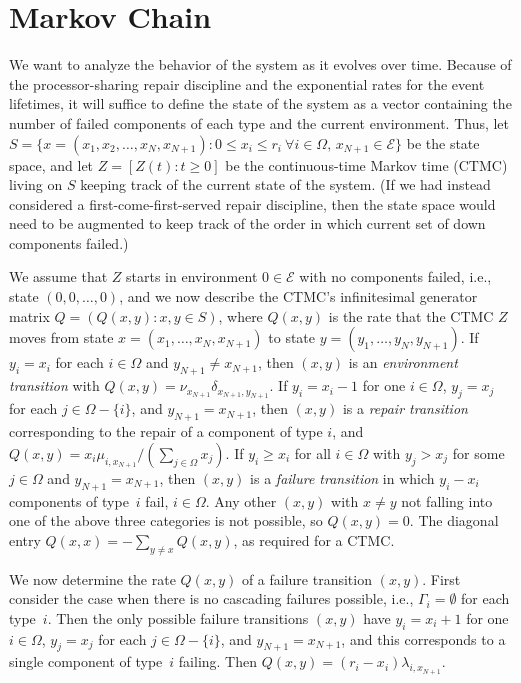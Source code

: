 \documentclass[12pt]{article}
\begin{document}
\section{Markov Chain}
\label{sec:ctmc}

We want to analyze the behavior of the system as it evolves over time.  Because of the processor-sharing repair discipline and the exponential rates for the event lifetimes, it will suffice to define the state of the system as a vector containing the number of failed components of each type and the current environment. Thus, let $S = \{ x = (x_1, x_2, \ldots, x_N, x_{N + 1}) : 0 \leq x_i \leq r_i \ \forall i \in \Omega, \, x_{N + 1} \in \mathcal{E} \}$ be the state space, and let $Z = [Z(t) : t \geq 0]$ be the continuous-time Markov time (CTMC) living on $S$ keeping track of the current state of the system. (If we had instead considered a first-come-first-served repair discipline, then the state space would need to be augmented to keep track of the order in which current set of down components failed.)

We assume that $Z$ starts in environment $0 \in \mathcal{E}$ with no components failed, i.e., state $(0,0, \ldots, 0)$, and we now describe the CTMC's infinitesimal generator matrix $Q = (Q(x, y) : x, y \in S)$, where $Q(x, y)$ is the rate that the CTMC $Z$ moves from state $x = (x_1, \ldots, x_N, x_{N + 1})$ to state $y = (y_1, \ldots, y_N, y_{N + 1})$. If $y_i = x_i$ for each $i \in \Omega$ and $y_{N + 1} \neq x_{N + 1}$, then $(x, y)$ is an \textit{environment transition} with $Q(x, y) = \nu_{x_{N + 1}} \delta_{x_{N + 1},y_{N + 1}}$. If $y_i = x_i - 1$ for one $i \in \Omega$, $y_j = x_j$ for each $j \in \Omega - \{ i \}$, and $y_{N + 1} = x_{N + 1}$, then $(x, y)$ is a \textit{repair transition} corresponding to the repair of a component of type $i$, and $Q(x, y) = x_i \mu_{i,x_{N + 1}}/(\sum_{j \in \Omega} x_j)$. If $y_i \geq x_i$ for all $i \in \Omega$ with $y_j > x_j$ for some $j \in \Omega$ and $y_{N + 1} = x_{N + 1}$, then $(x, y)$ is a \textit{failure transition} in which $y_i - x_i$ components of type~$i$ fail, $i \in \Omega$. Any other $(x, y)$ with $x \neq y$ not falling into one of the above three categories is not possible, so $Q(x, y) = 0$. The diagonal entry $Q(x, x) = -\sum_{y \neq x} Q(x, y)$, as required for a CTMC.

We now determine the rate $Q(x, y)$ of a failure transition $(x, y)$. First consider the case when there is no cascading failures possible, i.e., $\Gamma_i = \emptyset$ for each type~$i$. Then the only possible failure transitions $(x , y)$ have $y_i = x_i + 1$ for one $i \in \Omega$, $y_j = x_j$ for each $j \in \Omega - \{ i \}$, and $y_{N + 1} = x_{N + 1}$, and this corresponds to a single component of type~$i$ failing. Then $Q(x, y) = (r_i - x_i) \lambda_{i, x_{N + 1}}$.
\end{document}
